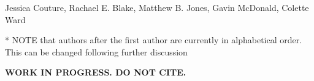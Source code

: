 Jessica Couture,
Rachael E. Blake,
Matthew B. Jones,
Gavin McDonald, 
Colette Ward

* NOTE that authors after the first author are currently in alphabetical order.  This can be changed following further discussion

\textbf{WORK IN PROGRESS. DO NOT CITE.}

